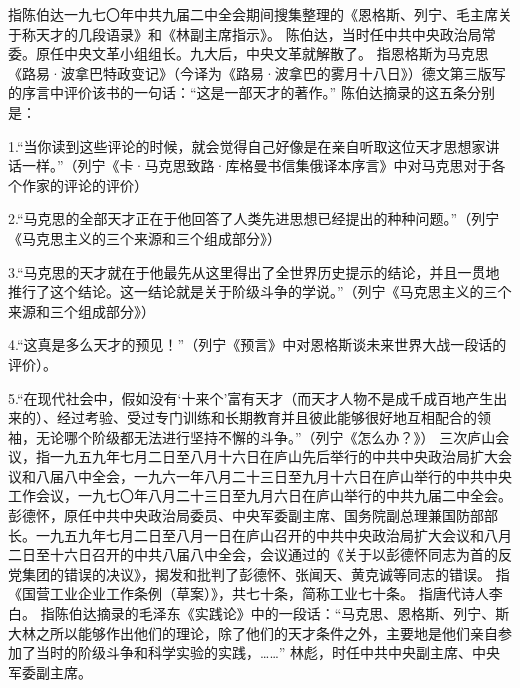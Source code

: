 \begin{maonote}
指陈伯达一九七〇年中共九届二中全会期间搜集整理的《恩格斯、列宁、毛主席关于称天才的几段语录》和《林副主席指示》。
陈伯达，当时任中共中央政治局常委。原任中央文革小组组长。九大后，中央文革就解散了。
指恩格斯为马克思《路易·波拿巴特政变记》（今译为《路易·波拿巴的雾月十八日》）德文第三版写的序言中评价该书的一句话：“这是一部天才的著作。”
陈伯达摘录的这五条分别是：

1.“当你读到这些评论的时候，就会觉得自己好像是在亲自听取这位天才思想家讲话一样。”（列宁《卡·马克思致路·库格曼书信集俄译本序言》中对马克思对于各个作家的评论的评价）

2.“马克思的全部天才正在于他回答了人类先进思想已经提出的种种问题。”（列宁《马克思主义的三个来源和三个组成部分》）

3.“马克思的天才就在于他最先从这里得出了全世界历史提示的结论，并且一贯地推行了这个结论。这一结论就是关于阶级斗争的学说。”（列宁《马克思主义的三个来源和三个组成部分》）

4.“这真是多么天才的预见！”（列宁《预言》中对恩格斯谈未来世界大战一段话的评价）。

5.“在现代社会中，假如没有‘十来个’富有天才（而天才人物不是成千成百地产生出来的）、经过考验、受过专门训练和长期教育并且彼此能够很好地互相配合的领袖，无论哪个阶级都无法进行坚持不懈的斗争。”（列宁《怎么办？》）
三次庐山会议，指一九五九年七月二日至八月十六日在庐山先后举行的中共中央政治局扩大会议和八届八中全会，一九六一年八月二十三日至九月十六日在庐山举行的中共中央工作会议，一九七〇年八月二十三日至九月六日在庐山举行的中共九届二中全会。
彭德怀，原任中共中央政治局委员、中央军委副主席、国务院副总理兼国防部部长。一九五九年七月二日至八月一日在庐山召开的中共中央政治局扩大会议和八月二日至十六日召开的中共八届八中全会，会议通过的《关于以彭德怀同志为首的反党集团的错误的决议》，揭发和批判了彭德怀、张闻天、黄克诚等同志的错误。
指《国营工业企业工作条例（草案）》，共七十条，简称工业七十条。
指唐代诗人李白。
指陈伯达摘录的毛泽东《实践论》中的一段话：“马克思、恩格斯、列宁、斯大林之所以能够作出他们的理论，除了他们的天才条件之外，主要地是他们亲自参加了当时的阶级斗争和科学实验的实践，……”
林彪，时任中共中央副主席、中央军委副主席。
\end{maonote}

